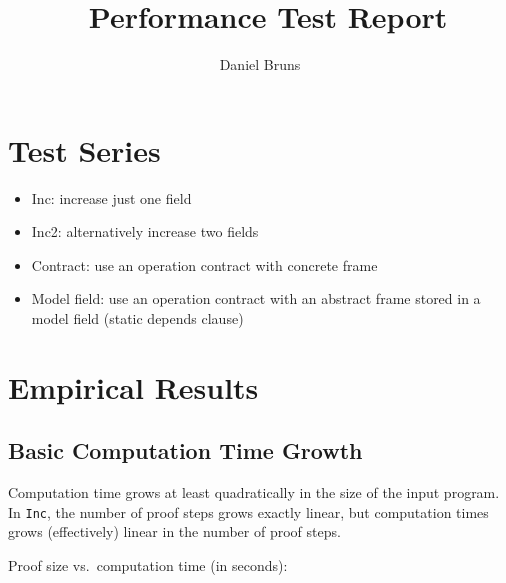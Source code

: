 \documentclass[a4paper]{article}
\title{\KeY\ Performance Test Report}
\author{Daniel Bruns}
\begin{document}
\maketitle

\section{Test Series}
\begin{itemize}
  \item Inc: increase just one field 
  \item Inc2: alternatively increase two fields
  \item Contract: use an operation contract with
		concrete frame
  \item Model field: use an operation contract
		with an abstract frame stored in
		a model field (static depends clause)
\end{itemize}

\section{Empirical Results}
\subsection{Basic Computation Time Growth}
Computation time grows at least quadratically in the
size of the input program.
In \texttt{Inc}, the number of proof steps grows
exactly linear, but computation times grows (effectively) linear in the number of proof steps.

Proof size vs.\ computation time (in seconds):\\
\end{document}
